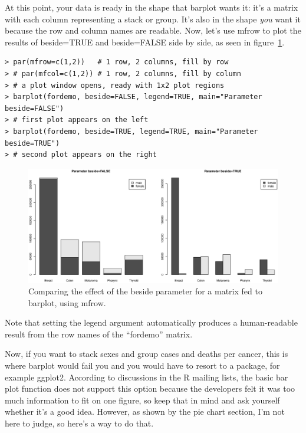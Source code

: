 \documentclass{report}
\newcommand{\code}[1]{\textsf{\ttfamily #1}}
\begin{document}
	At this point, your data is ready in the shape that \code{barplot} wants it: it's a matrix with each column representing a stack or group. It's also in the shape \emph{you} want it because the row and column names are readable. Now, let's use \code{mfrow} to plot the results of \code{beside=TRUE} and \code{beside=FALSE} side by side, as seen in figure~\ref{fig:mfrow}.
	\begin{verbatim}
> par(mfrow=c(1,2))   # 1 row, 2 columns, fill by row
> # par(mfcol=c(1,2)) # 1 row, 2 columns, fill by column
> # a plot window opens, ready with 1x2 plot regions
> barplot(fordemo, beside=FALSE, legend=TRUE, main="Parameter beside=FALSE")
> # first plot appears on the left
> barplot(fordemo, beside=TRUE, legend=TRUE, main="Parameter beside=TRUE")
> # second plot appears on the right
	\end{verbatim}
	
	\begin{figure}[h]
		\centering
		\includegraphics[width=1.0\textwidth]{mfrow.eps}
		\caption{Comparing the effect of the \code{beside} parameter for a matrix fed to \code{barplot}, using \code{mfrow}.}
		\label{fig:mfrow}
	\end{figure}

	Note that setting the \code{legend} argument automatically produces a human-readable result from the row names of the ``fordemo'' matrix.
	
	Now, if you want to stack sexes and group cases and deaths per cancer, this is where \code{barplot} would fail you and you would have to resort to a package, for example \code{ggplot2}. According to discussions in the R mailing lists, the basic bar plot function does not support this option because the developers felt it was too much information to fit on one figure, so keep that in mind and ask yourself whether it's a good idea. However, as shown by the pie chart section, I'm not here to judge, so here's a way to do that.
	
\end{document}

